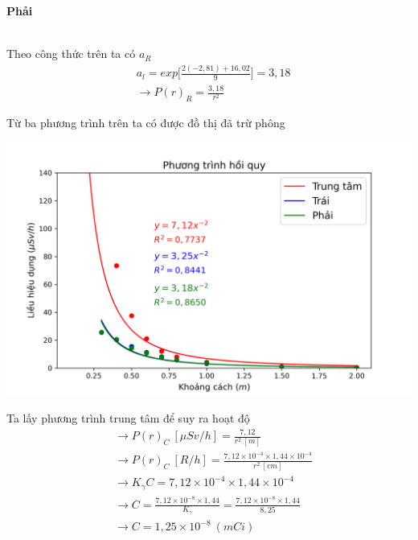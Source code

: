\documentclass{article}
\begin{document}
\textbf{Phải}
\begin{table}[!ht]
    \centering
\end{table}
\\
Theo công thức trên ta có $a_R$
\begin{align*}
	& a_l = exp\Bigg[\frac{2(-2,81) + 16,02}{9}\Bigg] = 3,18 \\
	& \rightarrow P(r)_R = \frac{3,18}{r^2}
\end{align*}

\newpage
Từ ba phương trình trên ta có được đồ thị đã trừ phông
\begin{center}
	\includegraphics[scale=0.8]{ttb9_b7}
\end{center}

Ta lấy phương trình trung tâm để suy ra hoạt độ
\begin{align*}
	& \rightarrow P(r)_C  \ [\mu Sv/h] = \frac{7,12}{r^2 \ [m]} \\
	& \rightarrow P(r)_C  \ [R/h] = \frac{7,12\times 10^{-4}\times 1,44 \times 10^{-4}}{r^2 \ [cm]} \\
	& \rightarrow K_{\gamma}C = 7,12\times 10^{-4}\times 1,44 \times 10^{-4} \\
	& \rightarrow C = \frac{ 7,12\times 10^{-8}\times 1,44}{ K_{\gamma}} = \frac{ 7,12\times 10^{-8}\times 1,44}{ 8,25 } \\
	& \rightarrow C = 1,25 \times 10^{-8} \ (mCi)
\end{align*}

\newpage
\clearpage\thispagestyle{empty}\addtocounter{page}{-1} 
\clearpage
\mbox{}
\newpage
\end{document}
